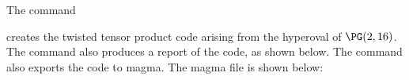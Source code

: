 The command 


creates the twisted tensor product code 
arising from the hyperoval of $\PG(2,16)$. 
The command also produces a report of the code, as shown below.
The command also exports the code to magma. The magma file is shown below:
